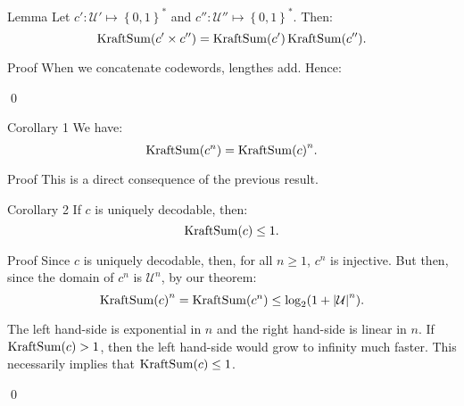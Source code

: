 \documentclass[a4paper]{article}
\begin{document}
\begin{parag}{Lemma}
    Let $c': \mathcal{U}' \mapsto \left\{0, 1\right\}^*$ and $c'': \mathcal{U}'' \mapsto \left\{0, 1\right\}^*$. Then: 
    \[\KraftSum\left(c' \times c''\right) = \KraftSum\left(c'\right) \KraftSum\left(c''\right).\]
    
    \begin{subparag}{Proof}
        When we concatenate codewords, lengthes add. Hence: 

        \qed
    \end{subparag}
\end{parag}

\begin{parag}{Corollary 1}
    We have: 
    \[\KraftSum\left(c^n\right) = \KraftSum\left(c\right)^n.\]
    
    \begin{subparag}{Proof}
        This is a direct consequence of the previous result.
    \end{subparag}
\end{parag}

\begin{parag}{Corollary 2}
    If $c$ is uniquely decodable, then: 
    \[\KraftSum\left(c\right) \leq 1.\]

    \begin{subparag}{Proof}
        Since $c$ is uniquely decodable, then, for all $n \geq 1$, $c^n$ is injective. But then, since the domain of $c^n$ is $\mathcal{U}^n$, by our theorem: 
        \[\KraftSum\left(c\right)^n = \KraftSum\left(c^n\right) \leq \log_2\left(1 + \left|\mathcal{U}\right|^n\right).\]

        The left hand-side is exponential in $n$ and the right hand-side is linear in $n$. If $\KraftSum\left(c\right) > 1$, then the left hand-side would grow to infinity much faster. This necessarily implies that $\KraftSum\left(c\right) \leq 1$.

        \qed
    \end{subparag}
\end{parag}
\end{document}
